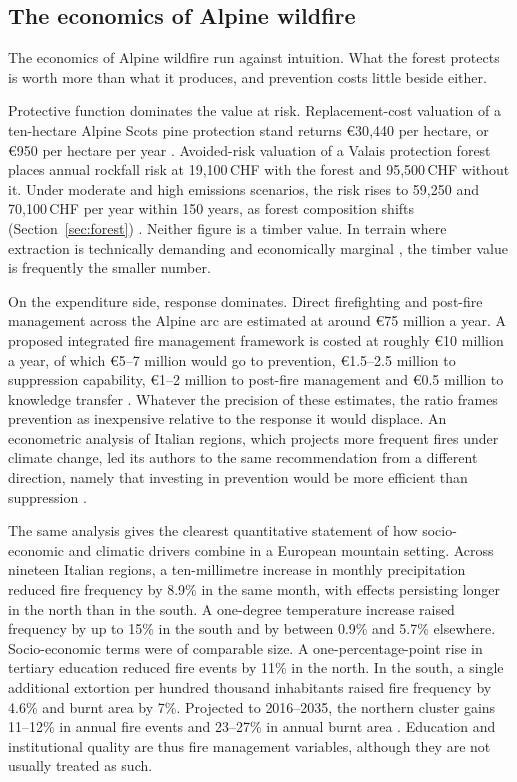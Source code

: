 \documentclass[11pt,a4paper]{article}
\begin{document}
\subsection{The economics of Alpine wildfire}
\label{sec:economics}

The economics of Alpine wildfire run against intuition. What the forest protects is worth more than what it produces, and prevention costs little beside either.

Protective function dominates the value at risk. Replacement-cost valuation of a ten-hectare Alpine Scots pine protection stand returns €30{,}440 per hectare, or €950 per hectare per year \citep{accastello_asforesee_2019}. Avoided-risk valuation of a Valais protection forest places annual rockfall risk at 19{,}100\,CHF with the forest and 95{,}500\,CHF without it. Under moderate and high emissions scenarios, the risk rises to 59{,}250 and 70{,}100\,CHF per year within 150 years, as forest composition shifts (Section~\ref{sec:forest}) \citep{moos_climate_2021}. Neither figure is a timber value. In terrain where extraction is technically demanding and economically marginal \citep{dinca_timber_2025}, the timber value is frequently the smaller number.

On the expenditure side, response dominates. Direct firefighting and post-fire management across the Alpine arc are estimated at around €75 million a year. A proposed integrated fire management framework is costed at roughly €10 million a year, of which €5--7 million would go to prevention, €1.5--2.5 million to suppression capability, €1--2 million to post-fire management and €0.5 million to knowledge transfer \citep{muller_forest_2020}. Whatever the precision of these estimates, the ratio frames prevention as inexpensive relative to the response it would displace. An econometric analysis of Italian regions, which projects more frequent fires under climate change, led its authors to the same recommendation from a different direction, namely that investing in prevention would be more efficient than suppression \citep{michetti_forest_2019}.

The same analysis gives the clearest quantitative statement of how socio-economic and climatic drivers combine in a European mountain setting. Across nineteen Italian regions, a ten-millimetre increase in monthly precipitation reduced fire frequency by 8.9\% in the same month, with effects persisting longer in the north than in the south. A one-degree temperature increase raised frequency by up to 15\% in the south and by between 0.9\% and 5.7\% elsewhere. Socio-economic terms were of comparable size. A one-percentage-point rise in tertiary education reduced fire events by 11\% in the north. In the south, a single additional extortion per hundred thousand inhabitants raised fire frequency by 4.6\% and burnt area by 7\%. Projected to 2016--2035, the northern cluster gains 11--12\% in annual fire events and 23--27\% in annual burnt area \citep{michetti_forest_2019}. Education and institutional quality are thus fire management variables, although they are not usually treated as such.
\end{document}
